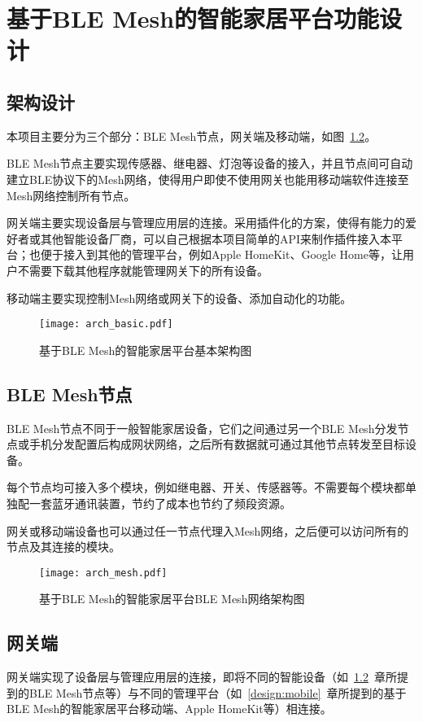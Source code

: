 \chapter{基于BLE Mesh的智能家居平台功能设计}

\section{架构设计}
本项目主要分为三个部分：BLE Mesh节点，网关端及移动端，如图~\ref{fig:arch}。

BLE Mesh节点主要实现传感器、继电器、灯泡等设备的接入，并且节点间可自动建立BLE协议下的Mesh网络，使得用户即使不使用网关也能用移动端软件连接至Mesh网络控制所有节点。

网关端主要实现设备层与管理应用层的连接。采用插件化的方案，使得有能力的爱好者或其他智能设备厂商，可以自己根据本项目简单的API来制作插件接入本平台；也便于接入到其他的管理平台，例如Apple HomeKit、Google Home等，让用户不需要下载其他程序就能管理网关下的所有设备。

移动端主要实现控制Mesh网络或网关下的设备、添加自动化的功能。
\begin{figure}[H]
    \centering
    \texttt{[image: arch\_basic.pdf]}
    \caption{基于BLE Mesh的智能家居平台基本架构图}
    \label{fig:arch}
\end{figure}

\section{BLE Mesh节点}
\label{design:blemeshnode}
BLE Mesh节点不同于一般智能家居设备，它们之间通过另一个BLE Mesh分发节点或手机分发配置后构成网状网络，之后所有数据就可通过其他节点转发至目标设备。

每个节点均可接入多个模块，例如继电器、开关、传感器等。不需要每个模块都单独配一套蓝牙通讯装置，节约了成本也节约了频段资源。

网关或移动端设备也可以通过任一节点代理入Mesh网络，之后便可以访问所有的节点及其连接的模块。
\begin{figure}[H]
    \centering
    \texttt{[image: arch\_mesh.pdf]}
    \caption{基于BLE Mesh的智能家居平台BLE Mesh网络架构图}
    \label{fig:arch}
\end{figure}

\section{网关端}
网关端实现了设备层与管理应用层的连接，即将不同的智能设备（如~\ref{design:blemeshnode}~章所提到的BLE Mesh节点等）与不同的管理平台（如~\ref{design:mobile}~章所提到的基于BLE Mesh的智能家居平台移动端、Apple HomeKit等）相连接。

